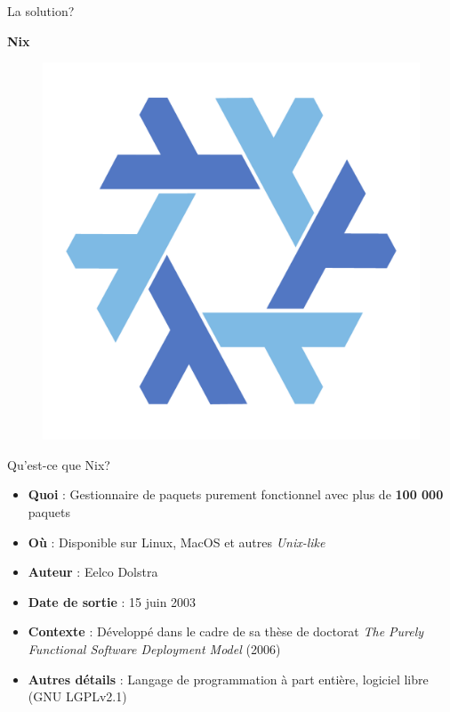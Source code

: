\documentclass{beamer}
\begin{document}
\begin{frame}{La solution?}
  \begin{center}
    \Huge{\textbf{Nix}}
  \end{center}
  \begin{figure}
    \centering
    \includegraphics[width=0.3\linewidth]{nix-logo.pdf}
  \end{figure}
\end{frame}


  \begin{frame}{Qu'est-ce que Nix?}
    \begin{itemize}
      \item \textbf{Quoi} : Gestionnaire de paquets purement fonctionnel avec 
        plus de \textbf{100 000} paquets \footnotemark[1]
      \item \textbf{Où} : Disponible sur Linux, MacOS et 
        autres \textit{Unix-like}
        \item \textbf{Auteur} : Eelco Dolstra
        \item \textbf{Date de sortie} : 15 juin 2003
        \item \textbf{Contexte} : Développé dans le cadre de sa thèse de
          doctorat \textit{The Purely Functional Software Deployment
          Model} (2006) \footnotemark[2]
        \item \textbf{Autres détails} : Langage de programmation à part entière,
          logiciel libre (GNU LGPLv2.1)
      \end{itemize}
\end{frame}
\end{document}
